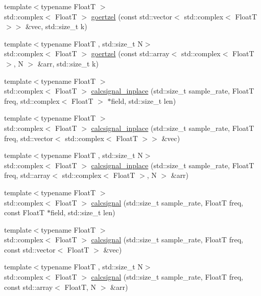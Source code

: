 \begin{DoxyCompactItemize}
{\footnotesize template$<$typename FloatT $>$ }\\std\+::complex$<$ FloatT $>$ \hyperlink{namespacedevfix_1_1dsp_a9c0640ca74af740499f9c3da2019930c}{goertzel} (const std\+::vector$<$ std\+::complex$<$ FloatT $>$$>$ \&vec, std\+::size\+\_\+t k)
\item 
{\footnotesize template$<$typename FloatT , std\+::size\+\_\+t N$>$ }\\std\+::complex$<$ FloatT $>$ \hyperlink{namespacedevfix_1_1dsp_a3eed4648161700e03c0f6d900bea9f73}{goertzel} (const std\+::array$<$ std\+::complex$<$ FloatT $>$, N $>$ \&arr, std\+::size\+\_\+t k)
\item 
{\footnotesize template$<$typename FloatT $>$ }\\std\+::complex$<$ FloatT $>$ \hyperlink{namespacedevfix_1_1dsp_a38dc66c795b9ebe6e8408d95c7a006c9}{calcsignal\+\_\+inplace} (std\+::size\+\_\+t sample\+\_\+rate, FloatT freq, std\+::complex$<$ FloatT $>$ $\ast$field, std\+::size\+\_\+t len)
\item 
{\footnotesize template$<$typename FloatT $>$ }\\std\+::complex$<$ FloatT $>$ \hyperlink{namespacedevfix_1_1dsp_af2bf29501002d08830f1a7ac3ff22289}{calcsignal\+\_\+inplace} (std\+::size\+\_\+t sample\+\_\+rate, FloatT freq, std\+::vector$<$ std\+::complex$<$ FloatT $>$$>$ \&vec)
\item 
{\footnotesize template$<$typename FloatT , std\+::size\+\_\+t N$>$ }\\std\+::complex$<$ FloatT $>$ \hyperlink{namespacedevfix_1_1dsp_ab4671999093ac0b52a1f3fdce063750d}{calcsignal\+\_\+inplace} (std\+::size\+\_\+t sample\+\_\+rate, FloatT freq, std\+::array$<$ std\+::complex$<$ FloatT $>$, N $>$ \&arr)
\item 
{\footnotesize template$<$typename FloatT $>$ }\\std\+::complex$<$ FloatT $>$ \hyperlink{namespacedevfix_1_1dsp_a1dc562f09e21a538a14df82aaa083526}{calcsignal} (std\+::size\+\_\+t sample\+\_\+rate, FloatT freq, const FloatT $\ast$field, std\+::size\+\_\+t len)
\item 
{\footnotesize template$<$typename FloatT $>$ }\\std\+::complex$<$ FloatT $>$ \hyperlink{namespacedevfix_1_1dsp_aa8a0808fce2bd9ec139788f9d7fa7e59}{calcsignal} (std\+::size\+\_\+t sample\+\_\+rate, FloatT freq, const std\+::vector$<$ FloatT $>$ \&vec)
\item 
{\footnotesize template$<$typename FloatT , std\+::size\+\_\+t N$>$ }\\std\+::complex$<$ FloatT $>$ \hyperlink{namespacedevfix_1_1dsp_af2156150e070c8ec603f0134371187d4}{calcsignal} (std\+::size\+\_\+t sample\+\_\+rate, FloatT freq, const std\+::array$<$ FloatT, N $>$ \&arr)

\end{DoxyCompactItemize}
